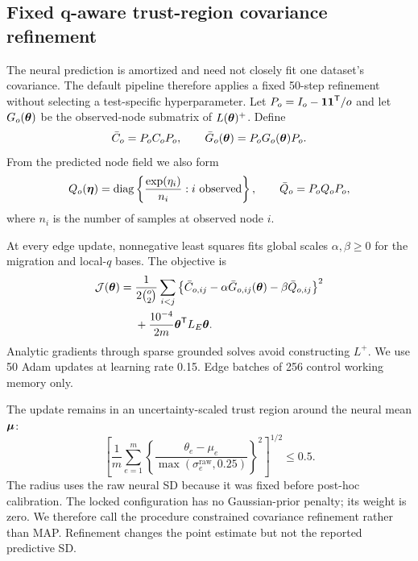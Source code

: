 \subsection{Fixed q-aware trust-region covariance refinement}

The neural prediction is amortized and need not closely fit one dataset's
covariance. The default pipeline therefore applies a fixed 50-step refinement
without selecting a test-specific hyperparameter. Let
$P_o=I_o-\boldsymbol{1}\boldsymbol{1}^\mathsf{T}/o$ and let $G_o(\boldsymbol{\theta})$ be the
observed-node submatrix of $L(\boldsymbol{\theta})^+$. Define
\begin{equation}
    \bar C_o=P_oC_oP_o,
    \qquad
    \bar G_o(\boldsymbol{\theta})=P_oG_o(\boldsymbol{\theta})P_o.
\end{equation}
From the predicted node field we also form
\begin{equation}
    Q_o(\boldsymbol{\eta})
    =\operatorname{diag}
      \left\{\frac{\exp(\eta_i)}{n_i}:i\text{ observed}\right\},
    \qquad
    \bar Q_o=P_oQ_oP_o,
\end{equation}
where $n_i$ is the number of samples at observed node $i$.

At every edge update, nonnegative least squares fits global scales
$\alpha,\beta\geq0$ for the migration and local-$q$ bases. The objective is
\begin{equation}
 \begin{split}
    \mathcal J(\boldsymbol{\theta})
    ={}&
    \frac{1}{2\binom{o}{2}}
    \sum_{i<j}
    \left\{
      \bar C_{o,ij}
      -\alpha\bar G_{o,ij}(\boldsymbol{\theta})
      -\beta\bar Q_{o,ij}
    \right\}^2\\
    &+\frac{10^{-4}}{2m}
      \boldsymbol{\theta}^\mathsf{T}L_E\boldsymbol{\theta}.
 \end{split}
 \label{eq:refinement-objective}
\end{equation}
Analytic gradients through sparse grounded solves avoid constructing $L^+$.
We use 50 Adam updates at learning rate 0.15. Edge batches of 256 control
working memory only.

The update remains in an uncertainty-scaled trust region around the neural
mean $\boldsymbol{\mu}$:
\begin{equation}
    \left[
      \frac{1}{m}\sum_{e=1}^m
      \left\{
        \frac{\theta_e-\mu_e}{\max(\sigma^{\mathrm{raw}}_e,0.25)}
      \right\}^2
    \right]^{1/2}
    \leq0.5.
    \label{eq:trust-region}
\end{equation}
The radius uses the raw neural SD because it was fixed before post-hoc
calibration. The locked configuration has no Gaussian-prior penalty; its
weight is zero. We therefore call the procedure constrained covariance
refinement rather than MAP. Refinement changes the point estimate but not the
reported predictive SD.

